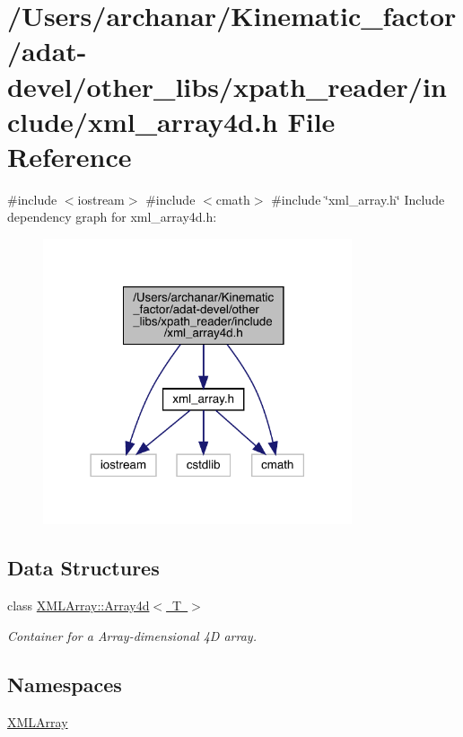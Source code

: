 \hypertarget{adat-devel_2other__libs_2xpath__reader_2include_2xml__array4d_8h}{}\section{/\+Users/archanar/\+Kinematic\+\_\+factor/adat-\/devel/other\+\_\+libs/xpath\+\_\+reader/include/xml\+\_\+array4d.h File Reference}
\label{adat-devel_2other__libs_2xpath__reader_2include_2xml__array4d_8h}
{\ttfamily \#include $<$iostream$>$}\newline
{\ttfamily \#include $<$cmath$>$}\newline
{\ttfamily \#include \char`\"{}xml\+\_\+array.\+h\char`\"{}}\newline
Include dependency graph for xml\+\_\+array4d.\+h\+:
\nopagebreak
\begin{figure}[H]
\begin{center}
\leavevmode
\includegraphics[width=258pt]{df/d3c/adat-devel_2other__libs_2xpath__reader_2include_2xml__array4d_8h__incl}
\end{center}
\end{figure}
\subsection*{Data Structures}
\begin{DoxyCompactItemize}
\item 
class \mbox{\hyperlink{classXMLArray_1_1Array4d}{X\+M\+L\+Array\+::\+Array4d$<$ T $>$}}
\begin{DoxyCompactList}\small\item\em Container for a Array-\/dimensional 4D array. \end{DoxyCompactList}\end{DoxyCompactItemize}
\subsection*{Namespaces}
\begin{DoxyCompactItemize}
\item 
 \mbox{\hyperlink{namespaceXMLArray}{X\+M\+L\+Array}}
\end{DoxyCompactItemize}
